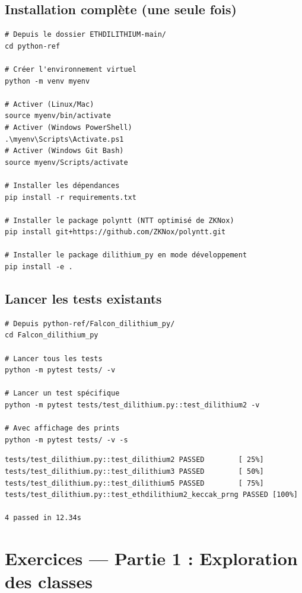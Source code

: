 \documentclass[12pt, a4paper]{article}
\begin{document}
\subsection{Installation complète (une seule fois)}

\begin{lstlisting}[style=bash]
# Depuis le dossier ETHDILITHIUM-main/
cd python-ref

# Créer l'environnement virtuel
python -m venv myenv

# Activer (Linux/Mac)
source myenv/bin/activate
# Activer (Windows PowerShell)
.\myenv\Scripts\Activate.ps1
# Activer (Windows Git Bash)
source myenv/Scripts/activate

# Installer les dépendances
pip install -r requirements.txt

# Installer le package polyntt (NTT optimisé de ZKNox)
pip install git+https://github.com/ZKNox/polyntt.git

# Installer le package dilithium_py en mode développement
pip install -e .
\end{lstlisting}

\subsection{Lancer les tests existants}

\begin{lstlisting}[style=bash]
# Depuis python-ref/Falcon_dilithium_py/
cd Falcon_dilithium_py

# Lancer tous les tests
python -m pytest tests/ -v

# Lancer un test spécifique
python -m pytest tests/test_dilithium.py::test_dilithium2 -v

# Avec affichage des prints
python -m pytest tests/ -v -s
\end{lstlisting}

\begin{lstlisting}[style=output]
tests/test_dilithium.py::test_dilithium2 PASSED        [ 25%]
tests/test_dilithium.py::test_dilithium3 PASSED        [ 50%]
tests/test_dilithium.py::test_dilithium5 PASSED        [ 75%]
tests/test_dilithium.py::test_ethdilithium2_keccak_prng PASSED [100%]

4 passed in 12.34s
\end{lstlisting}

\newpage
\section{Exercices --- Partie 1 : Exploration des classes}
\end{document}
